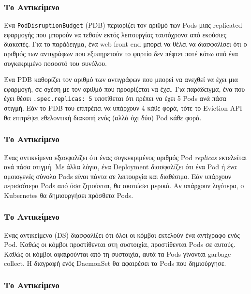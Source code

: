 \subsubsection{Το Αντικείμενο }

Ένα \texttt{PodDisruptionBudget} (PDB) περιορίζει τον αριθμό των Pods μιας
replicated εφαρμογής που μπορούν να τεθούν εκτός λειτουργίας ταυτόχρονα από
εκούσιες διακοπές. Για το παράδειγμα, ένα web front end μπορεί να θέλει να
διασφαλίσει ότι ο αριθμός των αντιγράφων που εξυπηρετούν το φορτίο δεν πέφτει
ποτέ κάτω από ένα συγκεκριμένο ποσοστό του συνόλου.

Ένα PDB καθορίζει τον αριθμό των αντιγράφων που μπορεί να ανεχθεί να έχει μια
εφαρμογή, σε σχέση με τον αριθμό που προορίζεται να έχει. Για παράδειγμα, ένα
 που έχει θέσει \texttt{.spec.replicas:\ 5} υποτίθεται ότι πρέπει
να έχει 5 Pods ανά πάσα στιγμή. Εάν το PDB του επιτρέπει να υπάρχουν 4 κάθε
φορά, τότε το Eviction API θα επιτρέψει εθελοντική διακοπή ενός (αλλά όχι δύο)
Pod κάθε φορά.

\subsubsection{Το Αντικείμενο }

Ένας αντικείμενο  εξασφαλίζει ότι ένας συγκεκριμένος αριθμός Pod
\textit{replicas} εκτελείται ανά πάσα στιγμή. Με άλλα λόγια, ένα Deployment
διασφαλίζει ότι ένα Pod ή ένα ομοιογενές σύνολο Pods είναι πάντα σε λειτουργία
και διαθέσιμο. Εάν υπάρχουν περισσότερα Pods από όσα ζητούνται, θα σκοτώσει
μερικά. Αν υπάρχουν λιγότερα, ο Kubernetes θα δημιουργήσει πρόσθετα Pods.

\subsubsection{Το Αντικείμενο }

Ένας αντικείμενο  (DS) διασφαλίζει ότι όλοι οι κόμβοι εκτελούν ένα
αντίγραφο ενός Pod. Καθώς οι κόμβοι προστίθενται στη συστοιχία, προστίθενται
Pods σε αυτούς. Καθώς οι κόμβοι αφαιρούνται από τη συστοιχία, αυτά τα Pods
γίνονται garbage collect. Η διαγραφή ενός DaemonSet θα αφαιρέσει τα Pods που
δημιούργησε.

\subsubsection{Το Αντικείμενο }

